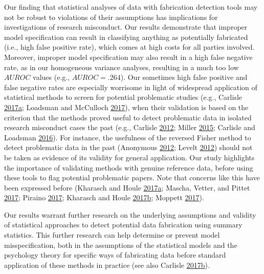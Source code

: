 \documentclass[a5paper]{book}
\begin{document}
Our finding that statistical analyses of data with fabrication detection
tools may not be robust to violations of their assumptions has
implications for investigations of research misconduct. Our results
demonstrate that improper model specification can result in classifying
anything as potentially fabricated (i.e., high false positive rate),
which comes at high costs for all parties involved. Moreover, improper
model specification may also result in a high false negative rate, as in
our homogeneous variance analyses, resulting in a much too low \(AUROC\)
values (e.g., \(AUROC=.264\)). Our sometimes high false positive and
false negative rates are especially worrisome in light of widespread
application of statistical methods to screen for potential problematic
studies (e.g., Carlisle
\protect\hyperlink{ref-doi:10.1111ux2fanae.13938}{2017}\protect\hyperlink{ref-doi:10.1111ux2fanae.13938}{a};
Loadsman and McCulloch
\protect\hyperlink{ref-doi:10.1111ux2fanae.13962}{2017}), when their
validation is based on the criterion that the methods proved useful to
detect problematic data in isolated research misconduct cases the past
(e.g., Carlisle
\protect\hyperlink{ref-doi:10.1111ux2fj.1365-2044.2012.07128.x}{2012};
Miller \protect\hyperlink{ref-doi:10.1111ux2fanae.13165}{2015}; Carlisle
and Loadsman \protect\hyperlink{ref-doi:10.1111ux2fanae.13650}{2016}).
For instance, the usefulness of the reversed Fisher method to detect
problematic data in the past (Anonymous
\protect\hyperlink{ref-foerster-complaint}{2012}; Levelt
\protect\hyperlink{ref-Levelt2012}{2012}) should not be taken as
evidence of its validity for general application. Our study highlights
the importance of validating methods with genuine reference data, before
using these tools to flag potential problematic papers. Note that
concerns like this have been expressed before (Kharasch and Houle
\protect\hyperlink{ref-doi:10.1097ux2faln.0000000000001875}{2017}\protect\hyperlink{ref-doi:10.1097ux2faln.0000000000001875}{a};
Mascha, Vetter, and Pittet
\protect\hyperlink{ref-doi:10.1213ux2fane.0000000000002415}{2017};
Piraino \protect\hyperlink{ref-doi:10.1101ux2f179135}{2017}; Kharasch
and Houle
\protect\hyperlink{ref-doi:10.1111ux2fanae.14147}{2017}\protect\hyperlink{ref-doi:10.1111ux2fanae.14147}{b};
Moppett \protect\hyperlink{ref-doi:10.1111ux2fanae.14048}{2017}).

Our results warrant further research on the underlying assumptions and
validity of statistical approaches to detect potential data fabrication
using summary statistics. This further research can help determine or
prevent model misspecification, both in the assumptions of the
statistical models and the psychology theory for specific ways of
fabricating data before standard application of these methods in
practice (see also Carlisle
\protect\hyperlink{ref-doi:10.1111ux2fanae.14148}{2017}\protect\hyperlink{ref-doi:10.1111ux2fanae.14148}{b}).
\end{document}
